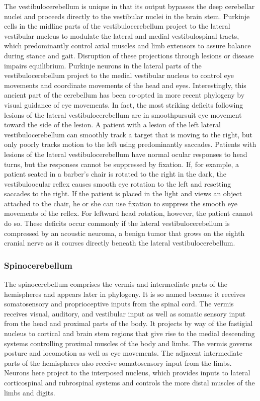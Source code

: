 \documentclass[12pt,a4paper,pdftex]{article}
\begin{document}
The vestibulocerebellum is unique in that its output bypasses the deep cerebellar nuclei and proceeds
directly to the vestibular nuclei in the brain stem. Purkinje cells in the midline parts of the vestibulocerebellum project to the lateral vestibular nucleus to modulate the lateral and medial vestibulospinal tracts, which predominantly control axial muscles and limb extensors to assure balance during stance and gait.
Disruption of these projections through lesions or disease impairs equilibrium. Purkinje neurons in the lateral parts of the vestibulocerebellum project to the medial vestibular nucleus to control eye movements and coordinate movements of the head and eyes. Interestingly, this ancient part of the cerebellum has been co-opted in more recent phylogeny by visual guidance of eye movements. In fact, the most striking deficits following lesions of the lateral vestibulocerebellum are in smoothpursuit eye movement toward the side of the lesion. A patient with a lesion of the left lateral vestibulocerebellum can smoothly track a target that is moving to the right, but only poorly tracks motion to the left using predominantly saccades. Patients with lesions of the lateral vestibulocerebellum have normal ocular responses to head turns, but the responses cannot be suppressed by fixation. If, for example, a patient seated in a barber’s chair is rotated to the right in the dark, the vestibuloocular reflex causes smooth eye rotation to the left and resetting saccades to the right. If the patient is placed in the light and views an object attached to the chair, he or she can use fixation to suppress the smooth eye movements of the reflex. For leftward head rotation, however, the patient cannot do so. These deficits occur commonly if the lateral vestibulocerebellum is compressed by an acoustic neuroma, a benign tumor that grows on the eighth cranial nerve as it courses directly beneath the lateral vestibulocerebellum.

\subsubsection*{Spinocerebellum}
The spinocerebellum comprises the vermis and intermediate parts of the hemispheres and appears later in phylogeny. It is so named because it receives somatosensory and proprioceptive inputs from the spinal cord. The vermis receives visual, auditory, and vestibular input as well as somatic sensory input from the head and proximal parts of the body. It projects by way of the fastigial nucleus to cortical and brain stem regions that give rise to the medial descending systems controlling proximal muscles of the body and limbs. The vermis governs posture and locomotion as well as eye movements. The adjacent intermediate parts of the hemispheres also receive somatosensory input from the limbs. Neurons here project to the interposed nucleus, which provides inputs to lateral corticospinal and rubrospinal systems and controls the more distal muscles of the limbs and digits.
\end{document}
